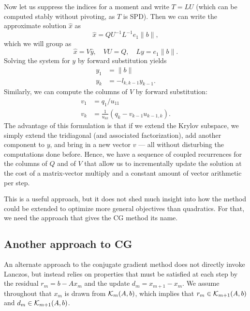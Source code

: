 Now let us suppress the indices for a moment and
write $T = LU$ (which can be computed stably without pivoting,
as $T$ is SPD).  Then we can write the approximate solution
$\hat{x}$ as
\[
  \hat{x} = Q U^{-1} L^{-1} e_1 \|b\|,
\]
which we will group as
\[
  \hat{x} = V \hat{y}, \quad VU = Q, \quad Ly = e_1 \|b\|.
\]
Solving the system for $y$ by forward substitution yields
\begin{align*}
  y_1 &= \|b\| \\
  y_k &= -l_{k,k-1} y_{k-1}.
\end{align*}
Similarly, we can compute the columns of $V$ by forward
substitution:
\begin{align*}
  v_1 &= q_1 / u_{11} \\
  v_k &= \frac{1}{u_{kk}} \left( q_k - v_{k-1} u_{k-1,k} \right).
\end{align*}
The advantage of this formulation is that if we extend the Krylov
subspace, we simply extend the tridiagonal (and associated
factorization), add another component to $y$, and bring in a new
vector $v$ --- all without disturbing the computations done before.
Hence, we have a sequence of coupled recurrences for the columns
of $Q$ and of $V$ that allow us to incrementally update the solution
at the cost of a matrix-vector multiply and a constant amount
of vector arithmetic per step.

This is a useful approach, but it does not shed much insight into how the
method could be extended to optimize more general objectives than
quadratics.  For that, we need the approach that gives the CG method its
name.

\subsection{Another approach to CG}

An alternate approach to the conjugate gradient method does not directly
invoke Lanczos, but instead relies on properties that must be satisfied
at each step by the residual $r_m = b-Ax_m$ and the update
$d_m = x_{m+1}-x_m$.  We assume throughout that $x_m$ is drawn from
$\mathcal{K}_m(A,b)$, which implies that $r_m \in \mathcal{K}_{m+1}(A,b)$ and
$d_m \in \mathcal{K}_{m+1}(A,b)$.

